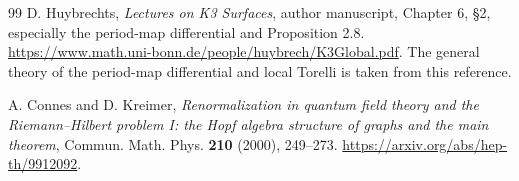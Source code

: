 \documentclass[11pt,a4paper,oneside]{article}
\theoremstyle{plain}
\theoremstyle{definition}
\theoremstyle{remark}
\numberwithin{equation}{section}
\begin{document}
\begin{thebibliography}{99}
D. Huybrechts,
\emph{Lectures on K3 Surfaces}, author manuscript,
Chapter 6, \S2, especially the period-map differential and Proposition 2.8.
\url{https://www.math.uni-bonn.de/people/huybrech/K3Global.pdf}.
The general theory of the period-map differential and local Torelli is taken from this reference.

A. Connes and D. Kreimer,
\emph{Renormalization in quantum field theory and the Riemann--Hilbert problem I:
the Hopf algebra structure of graphs and the main theorem},
Commun. Math. Phys. \textbf{210} (2000), 249--273.
\url{https://arxiv.org/abs/hep-th/9912092}.

\end{thebibliography}
\end{document}
